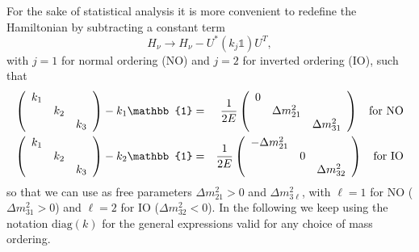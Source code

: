 \documentclass[11pt,a4paper]{article}
\begin{document}
For the sake of statistical analysis it is more convenient to redefine the Hamiltonian by subtracting a constant term
\begin{equation}
	H_\nu \rightarrow H_\nu - U^* \left(k_j \mathbb{1}\right) U^T,
\end{equation}
with $j=1$ for normal ordering (NO) and $j=2$ for inverted ordering (IO), such that
\begin{eqnarray}
	\left(\begin{array}{ccc}
k_1 &&\\
& k_2 & \\
&& k_3 	
\end{array} \right) - k_1 \mathbb{1} &=& \frac{1}{2E} \left( \begin{array}{ccc}
 0 && \\
 & \Delta m_{21}^2 & \\
 && \Delta m_{31}^2	
 \end{array} \right) \hspace{0.2cm} \text{ for NO} \label{eq:kinetic_NO}\\
	\left(\begin{array}{ccc}
k_1 &&\\
& k_2 & \\
&& k_3 	
\end{array} \right) - k_2 \mathbb{1} &=& \frac{1}{2E} \left( \begin{array}{ccc}
 - \Delta m_{21}^2 && \\
 & 0 & \\
 && \Delta m_{32}^2	
 \end{array} \right) \hspace{0.2cm} \text{ for IO} \label{eq:kinetic_IO}
\end{eqnarray}
so that we can use as free parameters $\Delta m_{21}^2 >0$ and $\Delta m_{3\ell}^2$, with $\ell=1$ for NO ($\Delta m_{31}^2 > 0$) and $\ell=2$ for IO ($\Delta m_{32}^2 < 0$). In the following we keep using the notation $\text{diag}(k)$ for the general expressions valid for any choice of mass ordering.
\end{document}
